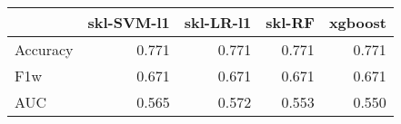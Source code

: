 \begin{tabular}{lrrrr}
\toprule
{} &  skl-SVM-l1 &  skl-LR-l1 &  skl-RF &  xgboost \\
\midrule
Accuracy &       0.771 &      0.771 &   0.771 &    0.771 \\
F1w      &       0.671 &      0.671 &   0.671 &    0.671 \\
AUC      &       0.565 &      0.572 &   0.553 &    0.550 \\
\bottomrule
\end{tabular}
